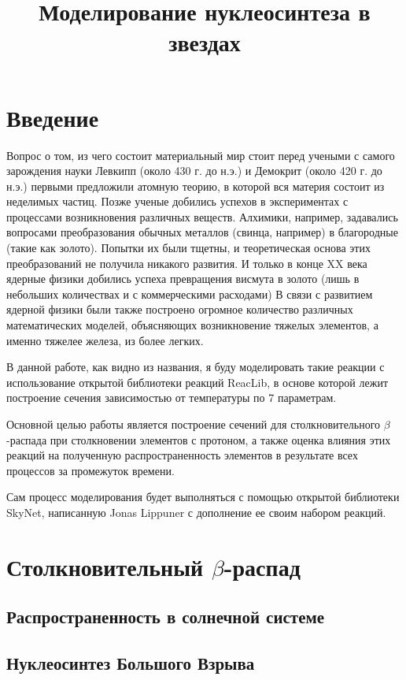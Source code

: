 \documentclass[%
master,    %
natbib,      %
subf,        %
href,        %
colorlinks,  %
]{disser}
\begin{document}
\title{Моделирование нуклеосинтеза в звездах}
\maketitle
\section*{\centering Введение}
Вопрос о том, из чего состоит материальный мир стоит перед учеными с самого зарождения науки Левкипп (около 430 г. до н.э.) и Демокрит (около 420 г. до н.э.) первыми предложили атомную теорию, в которой вся материя состоит из неделимых частиц. Позже ученые добились успехов в экспериментах с процессами возникновения различных веществ. Алхимики, например, задавались вопросами преобразования обычных металлов (свинца, например) в благородные (такие как золото). Попытки их были тщетны, и теоретическая основа этих преобразований не получила никакого развития. И только в конце XX века ядерные физики добились успеха превращения висмута в золото (лишь в небольших количествах и с коммерческими расходами)
В связи с развитием ядерной физики были также построено огромное количество различных математических моделей, объясняющих возникновение тяжелых элементов, а именно тяжелее железа, из более легких.

В данной работе, как видно из названия, я буду моделировать такие реакции с использование открытой библиотеки реакций ReacLib, в основе которой лежит построение сечения зависимостью от температуры по 7 параметрам. 

Основной целью работы является построение сечений для столкновительного $\beta$-распада при столкновении элементов с протоном, а также оценка влияния этих реакций на полученную распространенность элементов в результате всех процессов за промежуток времени.

Сам процесс моделирования будет выполняться с помощью открытой библиотеки SkyNet, написанную Jonas Lippuner с дополнение ее своим набором реакций.
\section{ Столкновительный $\beta$-распад}


\subsection{Распространенность в солнечной системе}


\subsection{Нуклеосинтез Большого Взрыва}
\end{document}
